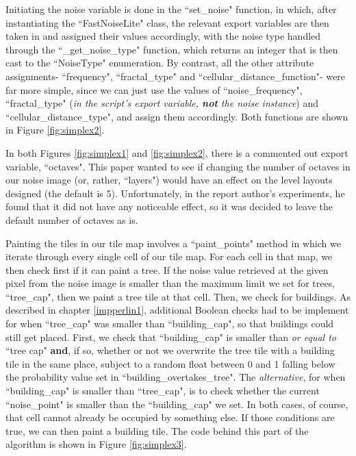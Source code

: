 Initiating the noise variable is done in the ``set\_noise" function, in which, after instantiating the ``FastNoiseLite" class, the relevant export variables are then taken in and assigned their values accordingly, with the noise type handled through the ``\_get\_noise\_type" function, which returns an integer that is then cast to the ``NoiseType" enumeration. By contrast, all the other attribute assignments- ``frequency", ``fractal\_type" and ``cellular\_distance\_function"- were far more simple, since we can just use the values of ``noise\_frequency", ``fractal\_type" (\textit{in the script's export variable, \textbf{not} the noise instance}) and ``cellular\_distance\_type", and assign them accordingly. Both functions are shown in Figure \ref{fig:simplex2}.

In both Figures \ref{fig:simplex1} and \ref{fig:simplex2}, there is a commented out export variable, ``octaves". This paper wanted to see if changing the number of octaves in our noise image (or, rather, ``layers") would have an effect on the level layouts designed (the default is 5\cite{fastnoiselitedocs}). Unfortunately, in the report author's experiments, he found that it did not have any noticeable effect, so it was decided to leave the default number of octaves as is. 

Painting the tiles in our tile map involves a ``paint\_points" method in which we iterate through every single cell of our tile map. For each cell in that map, we then check first if it can paint a tree. If the noise value retrieved at the given pixel from the noise image is smaller than the maximum limit we set for trees, ``tree\_cap", then we paint a tree tile at that cell. Then, we check for buildings. As described in chapter \ref{impperlin1}, additional Boolean checks had to be implement for when ``tree\_cap" was smaller than ``building\_cap", so that buildings could still get placed. First, we check that ``building\_cap" is smaller than \textit{or equal to} ``tree cap" \textbf{and}, if so, whether or not we overwrite the tree tile with a building tile in the same place, subject to a random float between 0 and 1 falling below the probability value set in ``building\_overtakes\_tree". The \textit{alternative}, for when ``building\_cap" is smaller than ``tree\_cap", is to check whether the current ``noise\_point" is smaller than the ``building\_cap" we set. In both cases, of course, that cell cannot already be occupied by something else. If those conditions are true, we can then paint a building tile. The code behind this part of the algorithm is shown in Figure \ref{fig:simplex3}.

